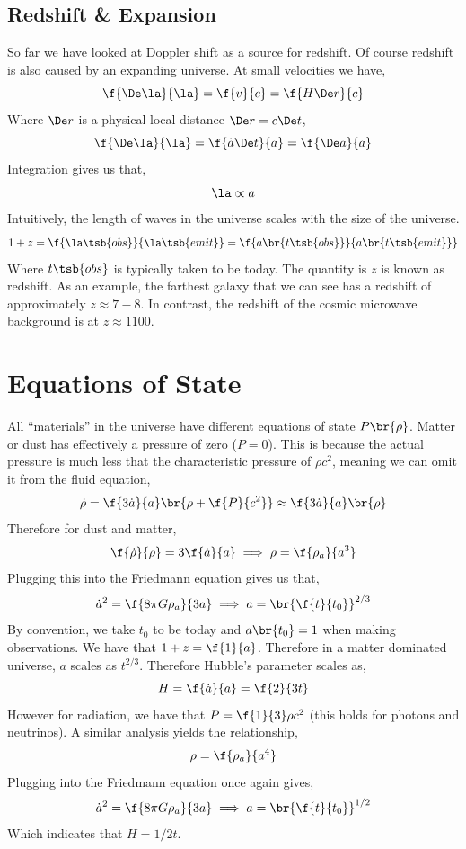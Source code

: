 \documentclass{article}
\begin{document}
\subsection{Redshift \& Expansion}
So far we have looked at Doppler shift as a source for redshift. Of course redshift is also caused by an expanding universe. At small velocities we have,
\[ \f{\De \la}{\la} = \f{v}{c} = \f{H \De r}{c} \]
Where $\De r$ is a physical local distance $\De r = c \De t$,
\[ \f{\De \la}{\la} = \f{\dot a \De t}{a} = \f{\De a}{a} \]
Integration gives us that,
\[ \la \propto a \]
Intuitively, the length of waves in the universe scales with the size of the universe.
\[ 1 + z = \f{\la\tsb{obs}}{\la\tsb{emit}} = \f{a\br{t\tsb{obs}}}{a\br{t\tsb{emit}}}  \]
Where $t\tsb{obs}$ is typically taken to be today. The quantity is $z$ is known as redshift. As an example, the farthest galaxy that we can see has a redshift of approximately $z \approx 7-8$. In contrast, the redshift of the cosmic microwave background is at $z \approx 1100$.

\section{Equations of State}
All ``materials'' in the universe have different equations of state $P\br{\rho}$. Matter or dust has effectively a pressure of zero ($P = 0$). This is because the actual pressure is much less that the characteristic pressure of $\rho c^2$, meaning we can omit it from the fluid equation,
\[ \dot\rho = \f{3 \dot a}{a} \br{\rho + \f{P}{c^2}} \approx \f{3 \dot a}{a} \br{\rho} \]
Therefore for dust and matter,
\[ \f{\dot \rho}{\rho} = 3\f{\dot a}{a} \implies \rho = \f{\rho_a}{a^3} \]
Plugging this into the Friedmann equation gives us that,
\[ \dot a^2 = \f{8\pi G \rho_a}{3a} \implies a = \br{\f{t}{t_0}}^{2/3} \]
By convention, we take $t_0$ to be today and $a\br{t_0} = 1$ when making observations. We have that $1 + z = \f{1}{a}$. Therefore in a matter dominated universe, $a$ scales as $t^{2/3}$. Therefore Hubble's parameter scales as,
\[ H = \f{\dot a}{a} = \f{2}{3t} \]
However for radiation, we have that $P = \f{1}{3} \rho c^2$ (this holds for photons and neutrinos). A similar analysis yields the relationship,
\[ \rho = \f{\rho_a}{a^4} \]
Plugging into the Friedmann equation once again gives,
\[ \dot a^2 = \f{8\pi G \rho_a}{3a} \implies a = \br{\f{t}{t_0}}^{1/2} \]
Which indicates that $H = 1/2t$. \\
\end{document}
